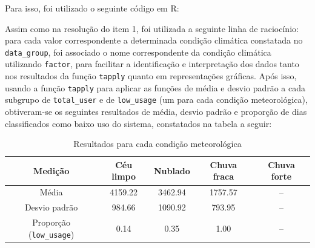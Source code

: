 Para isso, foi utilizado o seguinte código em R:


Assim como na resolução do item 1, foi utilizada a seguinte linha de raciocínio: para cada valor correspondente a determinada condição climática constatada no \texttt{data\_group}, foi associado o nome correspondente da condição climática utilizando \texttt{factor}, para facilitar a identificação e interpretação dos dados tanto nos resultados da função \texttt{tapply} quanto em representações gráficas. Após isso, usando a função \texttt{tapply} para aplicar as funções de média e desvio padrão a cada subgrupo de \texttt{total\_user} e de \texttt{low\_usage} (um para cada condição meteorológica), obtiveram-se os seguintes resultados de média, desvio padrão e proporção de dias classificados como baixo uso do sistema, constatados na tabela a seguir:

\begin{table}[h!]
    \centering
    \caption{Resultados para cada condição meteorológica}
    \label{tab:mascara_8u}
    \begin{tabular}{c|c|c|c|c}
        Medição & Céu limpo & Nublado & Chuva fraca & Chuva forte \\\hline
        Média &4159.22 &3462.94 &1757.57 &-- \\ \hline
        Desvio padrão &984.66 &1090.92 &793.95 &-- \\ \hline
        Proporção (\texttt{low\_usage}) &0.14 &0.35 &1.00 &--
    \end{tabular}
\end{table}

